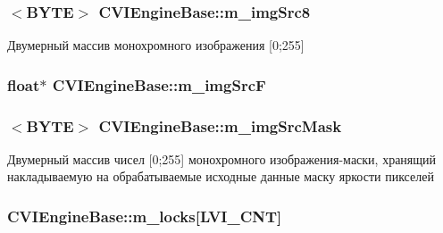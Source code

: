 \hypertarget{class_c_v_i_engine_base_aa935595a167539c89a4d06a57178d776}{
\subsubsection[{m\+\_\+img\+Src8}]{$<$B\+Y\+T\+E$>$ C\+V\+I\+Engine\+Base\+::m\+\_\+img\+Src8}}\label{class_c_v_i_engine_base_aa935595a167539c89a4d06a57178d776}


Двумерный массив монохромного изображения \mbox{[}0;255\mbox{]} 

\hypertarget{class_c_v_i_engine_base_a359f07597366b8c81727c32c9ff931be}{
\subsubsection[{m\+\_\+img\+Src\+F}]{\setlength{\rightskip}{0pt plus 5cm}float$\ast$ C\+V\+I\+Engine\+Base\+::m\+\_\+img\+Src\+F}}\label{class_c_v_i_engine_base_a359f07597366b8c81727c32c9ff931be}




\hypertarget{class_c_v_i_engine_base_a879bfc4065da678c4ca67ed828b05a05}{
\subsubsection[{m\+\_\+img\+Src\+Mask}]{$<$B\+Y\+T\+E$>$ C\+V\+I\+Engine\+Base\+::m\+\_\+img\+Src\+Mask}}\label{class_c_v_i_engine_base_a879bfc4065da678c4ca67ed828b05a05}


Двумерный массив чисел \mbox{[}0;255\mbox{]} монохромного изображения-\/маски, хранящий накладываемую на обрабатываемые исходные данные маску яркости пикселей 

\hypertarget{class_c_v_i_engine_base_a66562cd6aaf7fd0f9ade29c9096b9851}{
\subsubsection[{m\+\_\+locks}]{ C\+V\+I\+Engine\+Base\+::m\+\_\+locks\mbox{[}L\+V\+I\+\_\+\+C\+N\+T\mbox{]}}}\label{class_c_v_i_engine_base_a66562cd6aaf7fd0f9ade29c9096b9851}



